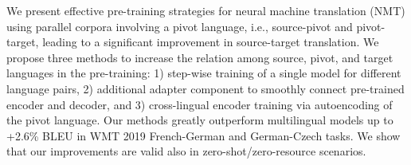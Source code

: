 We present effective pre-training strategies for neural machine translation (NMT) using parallel corpora involving a pivot language, i.e., source-pivot and pivot-target, leading to a significant improvement in source-target translation. We propose three methods to increase the relation among source, pivot, and target languages in the pre-training: 1) step-wise training of a single model for different language pairs, 2) additional adapter component to smoothly connect pre-trained encoder and decoder, and 3) cross-lingual encoder training via autoencoding of the pivot language. Our methods greatly outperform multilingual models up to +2.6\% BLEU in WMT 2019 French-German and German-Czech tasks. We show that our improvements are valid also in zero-shot/zero-resource scenarios.